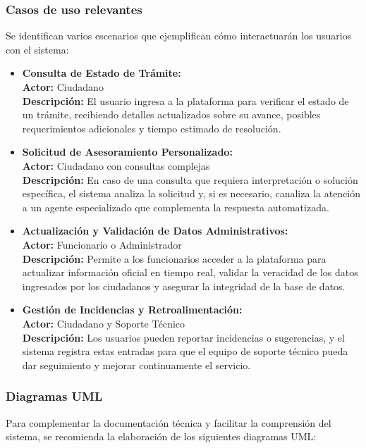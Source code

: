 \subsubsection{Casos de uso relevantes}
Se identifican varios escenarios que ejemplifican cómo interactuarán los usuarios con el sistema:
\begin{itemize}
    \item \textbf{Consulta de Estado de Trámite:} \\
    \textbf{Actor:} Ciudadano \\
    \textbf{Descripción:} El usuario ingresa a la plataforma para verificar el estado de un trámite, recibiendo detalles actualizados sobre su avance, posibles requerimientos adicionales y tiempo estimado de resolución.
    \item \textbf{Solicitud de Asesoramiento Personalizado:} \\
    \textbf{Actor:} Ciudadano con consultas complejas \\
    \textbf{Descripción:} En caso de una consulta que requiera interpretación o solución específica, el sistema analiza la solicitud y, si es necesario, canaliza la atención a un agente especializado que complementa la respuesta automatizada.
    \item \textbf{Actualización y Validación de Datos Administrativos:} \\
    \textbf{Actor:} Funcionario o Administrador \\
    \textbf{Descripción:} Permite a los funcionarios acceder a la plataforma para actualizar información oficial en tiempo real, validar la veracidad de los datos ingresados por los ciudadanos y asegurar la integridad de la base de datos.
    \item \textbf{Gestión de Incidencias y Retroalimentación:} \\
    \textbf{Actor:} Ciudadano y Soporte Técnico \\
    \textbf{Descripción:} Los usuarios pueden reportar incidencias o sugerencias, y el sistema registra estas entradas para que el equipo de soporte técnico pueda dar seguimiento y mejorar continuamente el servicio.
\end{itemize}

\subsubsection{Diagramas UML}
Para complementar la documentación técnica y facilitar la comprensión del sistema, se recomienda la elaboración de los siguientes diagramas UML:

